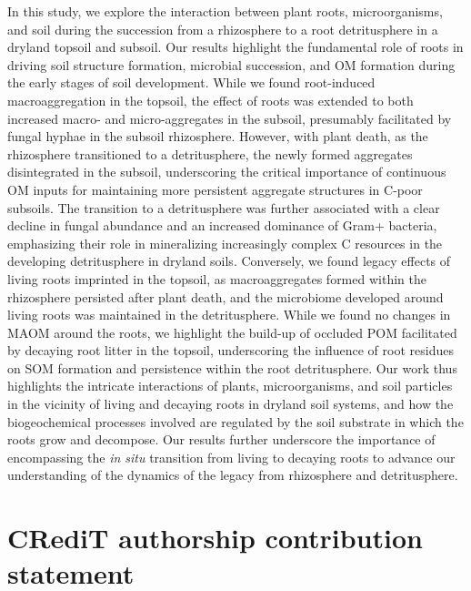 In this study, we explore the interaction between plant roots, microorganisms, and soil during the succession from a rhizosphere to a root detritusphere in a dryland topsoil and subsoil. Our results highlight the fundamental role of roots in driving soil structure formation, microbial succession, and OM formation during the early stages of soil development. While we found root-induced macroaggregation in the topsoil, the effect of roots was extended to both increased macro- and micro-aggregates in the subsoil, presumably facilitated by fungal hyphae in the subsoil rhizosphere. However, with plant death, as the rhizosphere transitioned to a detritusphere, the newly formed aggregates disintegrated in the subsoil, underscoring the critical importance of continuous OM inputs for maintaining more persistent aggregate structures in C-poor subsoils. The transition to a detritusphere was further associated with a clear decline in fungal abundance and an increased dominance of Gram+ bacteria, emphasizing their role in mineralizing increasingly complex C resources in the developing detritusphere in dryland soils. Conversely, we found legacy effects of living roots imprinted in the topsoil, as macroaggregates formed within the rhizosphere persisted after plant death, and the microbiome developed around living roots was maintained in the detritusphere. While we found no changes in MAOM around the roots, we highlight the build-up of occluded POM facilitated by decaying root litter in the topsoil, underscoring the influence of root residues on SOM formation and persistence within the root detritusphere. Our work thus highlights the intricate interactions of plants, microorganisms, and soil particles in the vicinity of living and decaying roots in dryland soil systems, and how the biogeochemical processes involved are regulated by the soil substrate in which the roots grow and decompose. Our results further underscore the importance of encompassing the \textit{in situ} transition from living to decaying roots to advance our understanding of the dynamics of the legacy from rhizosphere and detritusphere.

\section*{CRediT authorship contribution statement}

